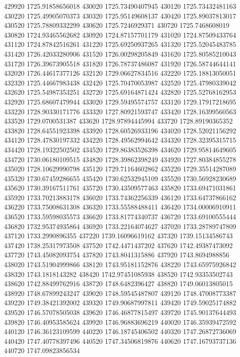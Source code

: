 {429920 1725.91858656018
430020 1725.73490407945
430120 1725.73432481163
430220 1725.49905070373
430320 1725.95149608137
430420 1725.89037813017
430520 1725.78809332299
430620 1725.7246929371
430720 1725.7468608019
430820 1724.93465562682
430920 1724.87157701179
431020 1724.87509433764
431120 1724.87842516261
431220 1725.69250937265
431320 1725.52045483785
431420 1726.42033280906
431520 1726.00298205849
431620 1725.80585210043
431720 1726.39673905518
431820 1726.78737486087
431920 1726.58744644141
432020 1726.44617377126
432120 1729.06627834516
432220 1725.18813050051
432320 1725.44667983438
432420 1725.70470053987
432520 1725.47980339042
432620 1725.54987353251
432720 1725.69164871424
432820 1725.52768162953
432920 1725.68607479944
433020 1729.59495574757
433120 1729.17917218695
433220 1728.90330171776
433320 1727.80921593747
433420 1728.16399560563
433520 1729.0700531387
433620 1728.97894445994
433720 1728.89190365352
433820 1728.64551923398
433920 1728.60526933196
434020 1728.52021156292
434120 1728.47830197332
434220 1728.49562994642
434320 1728.32395315715
434420 1728.19322502502
434520 1729.86383526398
434620 1729.95814649605
434720 1730.06180109515
434820 1728.39862398249
434920 1727.80384855278
435020 1728.10629990798
435120 1729.71164602862
435220 1729.35514287089
435320 1730.67459286655
435420 1730.62532945109
435520 1730.56928230689
435620 1730.39167511761
435720 1730.43509577463
435820 1733.69471031861
435920 1733.70213883178
436020 1733.74362256339
436120 1733.64737866162
436220 1733.75008631308
436320 1733.55588488411
436420 1734.00006910911
436520 1733.59598035573
436620 1733.81774340737
436720 1733.69100555444
436820 1732.95374935864
436920 1733.22164074627
437020 1733.28789747809
437120 1733.2990896355
437220 1739.16096619162
437320 1739.15134586743
437420 1738.25317973508
437520 1742.4471437202
437620 1742.49387473092
437720 1743.45082093754
437820 1743.8041315886
437920 1743.8694988856
438020 1743.51904999866
438120 1743.95181152876
438220 1743.65975926842
438320 1743.1818143282
438420 1742.97451085938
438520 1742.93353502743
438620 1742.88499762916
438720 1748.6482396427
438820 1749.06013805015
438920 1748.67899243247
439020 1748.59545487807
439120 1748.47008773387
439220 1749.38421392002
439320 1749.90687997811
439420 1749.59025174882
439520 1746.57078505038
439620 1746.46877815497
439720 1745.90137644493
439820 1746.40953585624
439920 1746.96883696219
440020 1746.35939472592
440120 1746.36123109599
440220 1746.18745406502
440320 1747.26872736069
440420 1747.40778397496
440520 1747.34506819876
440620 1747.16793737136
440720 1747.09823856534
}
